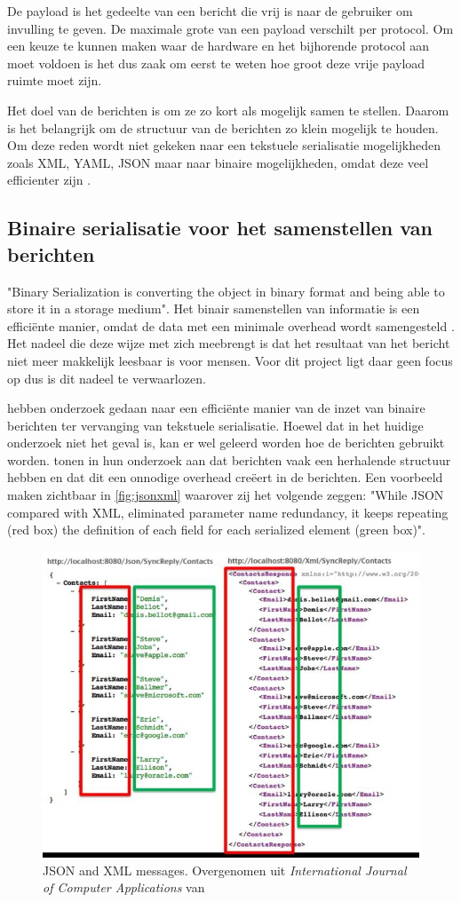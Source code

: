 \documentclass[a4paper, 11pt, oneside]{report}
\begin{document}
De payload is het gedeelte van een bericht die vrij is naar de gebruiker om invulling te geven.
De maximale grote van een payload verschilt per protocol.
Om een keuze te kunnen maken waar de hardware en het bijhorende protocol aan moet voldoen is het dus zaak om eerst te weten hoe groot deze vrije payload ruimte moet zijn.

Het doel van de berichten is om ze zo kort als mogelijk samen te stellen. 
Daarom is het belangrijk om de structuur van de berichten zo klein mogelijk te houden.
Om deze reden wordt niet gekeken naar een tekstuele serialisatie mogelijkheden zoals XML, YAML, JSON maar naar binaire mogelijkheden, omdat deze veel efficienter zijn \cite{binary}.

\subsection{Binaire serialisatie voor het samenstellen van berichten} 

"Binary Serialization is converting the object in binary format and being able to store it in a storage medium"\cite{binary}. 
Het binair samenstellen van informatie is een efficiënte manier, omdat de data met een minimale overhead wordt samengesteld \cite{binaryMessaging}.
Het nadeel die deze wijze met zich meebrengt is dat het resultaat van het bericht niet meer makkelijk leesbaar is voor mensen.
Voor dit project ligt daar geen focus op dus is dit nadeel te verwaarlozen.

 hebben onderzoek gedaan naar een efficiënte manier van de inzet van binaire berichten ter vervanging van tekstuele serialisatie.
Hoewel dat in het huidige onderzoek niet het geval is, kan er wel geleerd worden hoe de berichten gebruikt worden.
 tonen in hun onderzoek aan dat berichten vaak een herhalende structuur hebben en dat dit een onnodige overhead creëert in de berichten.
Een voorbeeld maken  zichtbaar in \autoref{fig:jsonxml} waarover zij het volgende zeggen: "While JSON  compared  with  XML,  eliminated  parameter  name redundancy, it keeps repeating (red box) the definition of each field  for  each  serialized  element  (green  box)". 
\begin{figure}[H]
	\begin{center}\includegraphics[width=0.5\linewidth]{JSONandXML.jpeg}\end{center}
	\caption{JSON and XML messages. Overgenomen uit \textit{International Journal of Computer Applications}  van \protect{}  }
	\label{fig:jsonxml}
\end{figure}
\end{document}
